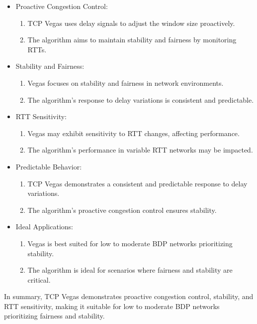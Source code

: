 \documentclass[11pt,a4paper]{article}
\begin{document}
\begin{itemize}
    \item Proactive Congestion Control: {
        \begin{enumerate}
            \item TCP Vegas uses delay signals to adjust the window size proactively.
            \item The algorithm aims to maintain stability and fairness by monitoring RTTs.
        \end{enumerate}
    }
    \item Stability and Fairness: {
        \begin{enumerate}
            \item Vegas focuses on stability and fairness in network environments.
            \item The algorithm's response to delay variations is consistent and predictable.
        \end{enumerate}
    }
    \item RTT Sensitivity: {
        \begin{enumerate}
            \item Vegas may exhibit sensitivity to RTT changes, affecting performance.
            \item The algorithm's performance in variable RTT networks may be impacted.
        \end{enumerate}
    }
    \item Predictable Behavior: {
        \begin{enumerate}
            \item TCP Vegas demonstrates a consistent and predictable response to delay variations.
            \item The algorithm's proactive congestion control ensures stability.
        \end{enumerate}
    }
    \item Ideal Applications: {
        \begin{enumerate}
            \item Vegas is best suited for low to moderate BDP networks prioritizing stability.
            \item The algorithm is ideal for scenarios where fairness and stability are critical.
        \end{enumerate}
    }
\end{itemize}

In summary, TCP Vegas demonstrates proactive congestion control, stability, and RTT sensitivity, making it suitable for low to moderate BDP networks prioritizing fairness and stability.
\end{document}
